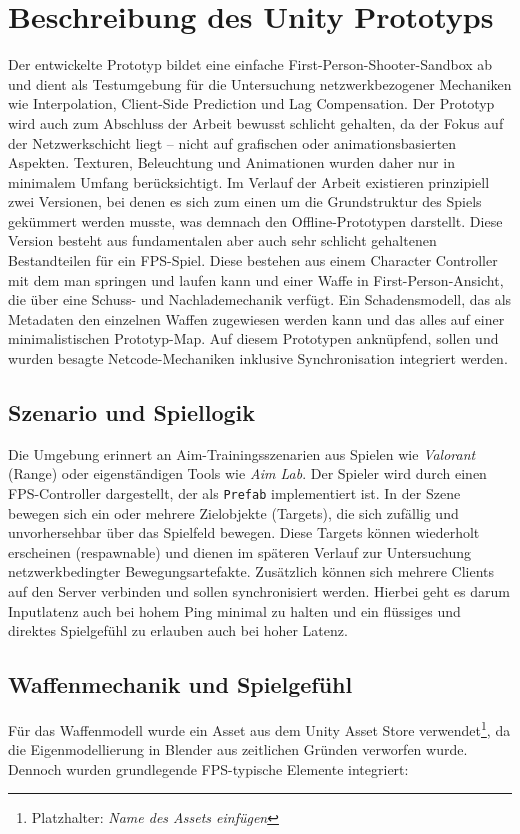 \chapter{Beschreibung des Unity Prototyps}

Der entwickelte Prototyp  bildet eine einfache First-Person-Shooter-Sandbox ab und dient als Testumgebung für die Untersuchung netzwerkbezogener Mechaniken wie Interpolation, Client-Side Prediction und Lag Compensation. Der Prototyp wird auch zum Abschluss der Arbeit bewusst schlicht gehalten, da der Fokus auf der Netzwerkschicht liegt – nicht auf grafischen oder animationsbasierten Aspekten. Texturen, Beleuchtung und Animationen wurden daher nur in minimalem Umfang berücksichtigt.
Im Verlauf der Arbeit existieren prinzipiell zwei Versionen, bei denen es sich zum einen um die Grundstruktur des Spiels gekümmert werden musste, was demnach den Offline-Prototypen darstellt. Diese Version besteht aus fundamentalen aber auch sehr schlicht gehaltenen Bestandteilen für ein FPS-Spiel. Diese bestehen aus einem Character Controller mit dem man springen und laufen kann und einer Waffe in First-Person-Ansicht, die über eine Schuss- und Nachlademechanik verfügt. 
Ein Schadensmodell, das als Metadaten den einzelnen Waffen zugewiesen werden kann und das alles auf einer minimalistischen Prototyp-Map.
Auf diesem Prototypen anknüpfend, sollen und wurden besagte Netcode-Mechaniken inklusive Synchronisation integriert werden.   

\newpage
\section{Szenario und Spiellogik}
Die Umgebung erinnert an Aim-Trainingsszenarien aus Spielen wie \textit{Valorant} (Range) oder eigenständigen Tools wie \textit{Aim Lab}. Der Spieler wird durch einen FPS-Controller dargestellt, der als \texttt{Prefab} implementiert ist. In der Szene bewegen sich ein oder mehrere Zielobjekte (Targets), die sich zufällig und unvorhersehbar über das Spielfeld bewegen. Diese Targets können wiederholt erscheinen (respawnable) und dienen im späteren Verlauf zur Untersuchung netzwerkbedingter Bewegungsartefakte.
Zusätzlich können sich mehrere Clients auf den Server verbinden und sollen synchronisiert werden. Hierbei geht es darum Inputlatenz auch bei hohem Ping minimal zu halten und ein flüssiges und direktes Spielgefühl zu erlauben auch bei hoher Latenz.


\section{Waffenmechanik und Spielgefühl}
Für das Waffenmodell wurde ein Asset aus dem Unity Asset Store verwendet\footnote{Platzhalter: \textit{Name des Assets einfügen}}, da die Eigenmodellierung in Blender aus zeitlichen Gründen verworfen wurde. Dennoch wurden grundlegende FPS-typische Elemente integriert:

